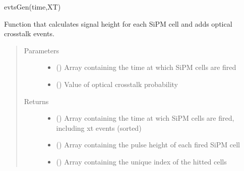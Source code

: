 \documentclass[letterpaper,10pt,english]{sphinxmanual}
\begin{document}
\begin{fulllineitems}
\label{\detokenize{structure:libs.lib.SiPMEventAction}}
evtsGen(time,XT)

Function that calculates signal height for each SiPM cell and adds optical crosstalk events.
\begin{quote}\begin{description}
\item[{Parameters}] \leavevmode\begin{itemize}
\item {} 
 () \textendash{} Array containing the time at which SiPM cells are fired

\item {} 
 () \textendash{} Value of optical crosstalk probability

\end{itemize}

\item[{Returns}] \leavevmode
\begin{itemize}
\item {} 
 () \textendash{} Array containing the time at wich SiPM cells are fired, including xt events (sorted)

\item {} 
 () \textendash{} Array containing the pulse height of each fired SiPM cell

\item {} 
 () \textendash{} Array containing the unique index of the hitted cells

\end{itemize}


\end{description}\end{quote}

\end{fulllineitems}

\end{document}
